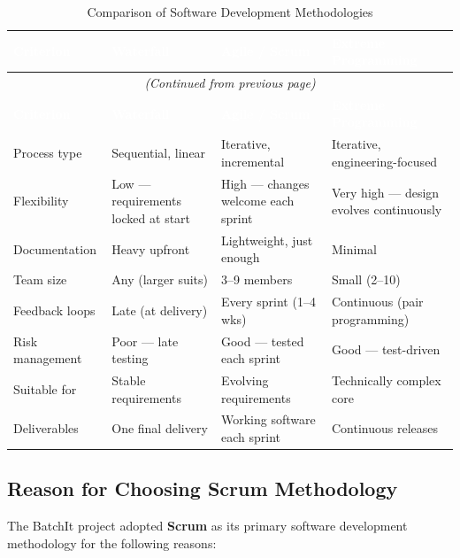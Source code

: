 \documentclass[12pt, a4paper]{report}
\begin{document}
\begin{longtable}{p{2.8cm} p{3.8cm} p{3.8cm} p{3.5cm}}
\caption{Comparison of Software Development Methodologies}\label{tab:methodologies}\\
\toprule
\rowcolor{tablehead}
\textcolor{white}{\textbf{Criterion}} &
\textcolor{white}{\textbf{Waterfall}} &
\textcolor{white}{\textbf{Agile / Scrum}} &
\textcolor{white}{\textbf{Extreme Programming}}\\
\midrule
\endfirsthead
\multicolumn{4}{c}{\small\itshape (Continued from previous page)}\\
\toprule
\rowcolor{tablehead}
\textcolor{white}{\textbf{Criterion}} &
\textcolor{white}{\textbf{Waterfall}} &
\textcolor{white}{\textbf{Agile / Scrum}} &
\textcolor{white}{\textbf{Extreme Programming}}\\
\midrule
\endhead
\bottomrule
\endfoot
Process type      & Sequential, linear    & Iterative, incremental & Iterative, engineering-focused\\
\rowcolor{batchitLight}
Flexibility       & Low --- requirements locked at start & High --- changes welcome each sprint & Very high --- design evolves continuously\\
Documentation     & Heavy upfront         & Lightweight, just enough & Minimal\\
\rowcolor{batchitLight}
Team size         & Any (larger suits)    & 3--9 members           & Small (2--10)\\
Feedback loops    & Late (at delivery)    & Every sprint (1--4 wks)& Continuous (pair programming)\\
\rowcolor{batchitLight}
Risk management   & Poor --- late testing & Good --- tested each sprint & Good --- test-driven\\
Suitable for      & Stable requirements   & Evolving requirements  & Technically complex core\\
\rowcolor{batchitLight}
Deliverables      & One final delivery    & Working software each sprint & Continuous releases\\
\end{longtable}

\subsection{Reason for Choosing Scrum Methodology}

The BatchIt project adopted \textbf{Scrum} as its primary software development methodology for the following reasons:
\end{document}
